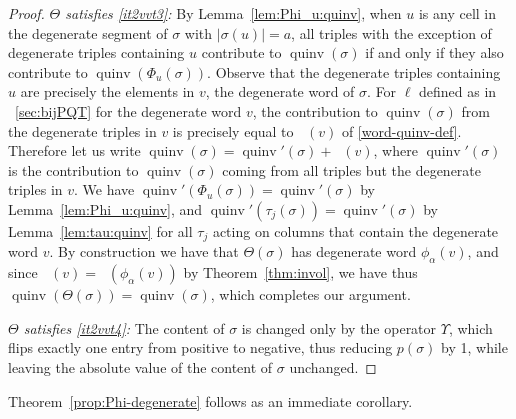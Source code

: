 \documentclass[ALCO,Unicode]{cedram}
\DeclareMathOperator{\quinvL}{\quinv^{(\ell)}}
\DeclareMathOperator{\quinv}{quinv}
\begin{document}
\begin{proof}
\emph{$\Theta$ satisfies \ref{it2vvt3}:} By Lemma~\ref{lem:Phi_u:quinv}, when $u$ is any cell in the degenerate segment of $\sigma$ with $|\sigma(u)|=a$, all triples with the exception of degenerate triples containing $u$ contribute to $\quinv(\sigma)$ if and only if they also contribute to $\quinv(\Phi_u(\sigma))$. Observe that the degenerate triples containing $u$ are precisely the elements in $v$, the degenerate word of $\sigma$. For $\ell$ defined as in ~\ref{sec:bijPQT} for the degenerate word $v$,  the contribution to $\quinv(\sigma)$ from the degenerate triples in $v$ is precisely equal to $\quinvL(v)$ of \eqref{word-quinv-def}. Therefore let us write $\quinv(\sigma)=\quinv'(\sigma)+\quinvL(v)$, where $\quinv'(\sigma)$ is the contribution to $\quinv(\sigma)$ coming from all triples but the degenerate triples in $v$. We have $\quinv'(\Phi_u(\sigma))=\quinv'(\sigma)$ by Lemma~\ref{lem:Phi_u:quinv}, and $\quinv'(\tau_j(\sigma))=\quinv'(\sigma)$ by Lemma~\ref{lem:tau:quinv} for all $\tau_j$ acting on columns that contain the degenerate word $v$. By construction we have that $\Theta(\sigma)$ has degenerate word $\phi_\alpha(v)$, and since $\quinvL(v)=\quinvL(\phi_\alpha(v))$ by Theorem~\ref{thm:invol}, we have thus $\quinv(\Theta(\sigma))=\quinv(\sigma)$, which completes our argument.

\emph{$\Theta$ satisfies \ref{it2vvt4}:} The content of $\sigma$ is changed only by the operator $\Upsilon$, which flips exactly one entry from positive to negative, thus reducing $p(\sigma)$ by 1, while leaving the absolute value of the content of $\sigma$ unchanged.
\end{proof}
Theorem~\ref{prop:Phi-degenerate} follows as an immediate corollary.
\end{document}
